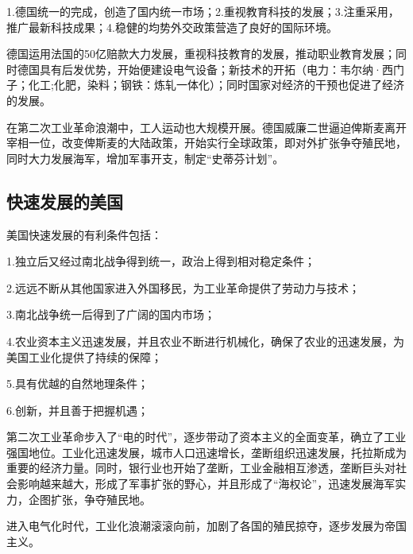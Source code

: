 1.德国统一的完成，创造了国内统一市场；2.重视教育科技的发展；3.注重采用，推广最新科技成果；4.稳健的均势外交政策营造了良好的国际环境。

德国运用法国的50亿赔款大力发展，重视科技教育的发展，推动职业教育发展；同时德国具有后发优势，开始便建设电气设备；新技术的开拓（电力：韦尔纳·西门子；化工;化肥，染料；钢铁：炼轧一体化）；同时国家对经济的干预也促进了经济的发展。

在第二次工业革命浪潮中，工人运动也大规模开展。德国威廉二世逼迫俾斯麦离开宰相一位，改变俾斯麦的大陆政策，开始实行全球政策，即对外扩张争夺殖民地，同时大力发展海军，增加军事开支，制定“史蒂芬计划”。

\subsection{快速发展的美国}
美国快速发展的有利条件包括：

1.独立后又经过南北战争得到统一，政治上得到相对稳定条件；

2.远远不断从其他国家进入外国移民，为工业革命提供了劳动力与技术；

3.南北战争统一后得到了广阔的国内市场；

4.农业资本主义迅速发展，并且农业不断进行机械化，确保了农业的迅速发展，为美国工业化提供了持续的保障；

5.具有优越的自然地理条件；

6.创新，并且善于把握机遇；

第二次工业革命步入了“电的时代”，逐步带动了资本主义的全面变革，确立了工业强国地位。工业化迅速发展，城市人口迅速增长，垄断组织迅速发展，托拉斯成为重要的经济力量。同时，银行业也开始了垄断，工业金融相互渗透，垄断巨头对社会影响越来越大，形成了军事扩张的野心，并且形成了“海权论”，迅速发展海军实力，企图扩张，争夺殖民地。

进入电气化时代，工业化浪潮滚滚向前，加剧了各国的殖民掠夺，逐步发展为帝国主义。
